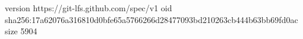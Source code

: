 version https://git-lfs.github.com/spec/v1
oid sha256:17a62076a316810d0bfe65a5766266d28477093bd210263cb444b63bb69fd0ac
size 5904
